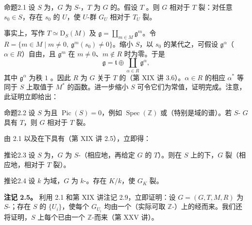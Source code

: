 \begin{SGAresult}{命题}{2.1} 设 $S$ 为，$G$ 为 $S$-，$T$ 为 $G$ 的。假设 $T$ 。则 $G$ 相对于 $T$ 裂：对任意 $s_0\in S$，存在 $s_0$ 的 $U$，使 $U$-群 $G_U$ 相对于 $T_U$ 裂。\end{SGAresult}
事实上，写作 $T\simeq\mathrm D_S(M)$ 及 $\mathfrak g=\coprod_{m\in M}\mathfrak g^m$。令 $R=\{m\in M\mid m\ne0,\ \mathfrak g^m(s_0)\ne0\}$。缩小 $S$，以 $s_0$ 的某代之，可假设 $\mathfrak g^\alpha$（$\alpha\in R$）自由，且 $\mathfrak g^m$ 在 $m\ne0$、$m\notin R$ 时为零。于是
\[\mathfrak g=\mathfrak t\oplus\coprod_{\alpha\in R}\mathfrak g^\alpha,\]
其中 $\mathfrak g^\alpha$ 为秩 $1$ 。因此 $R$ 为 $G$ 关于 $T$ 的（第 XIX 讲 3.6）。$\alpha\in R$ 的相应 $\alpha^*$ 等同于 $S$ 上取值于 $M^*$ 的函数。进一步缩小 $S$ 可令它们为常值，证明完成。注意，此证明立即给出：
\begin{SGAresult}{命题}{2.2} 设 $S$ 为且 $\operatorname{Pic}(S)=0$，例如 $\operatorname{Spec}(\mathbb Z)$ 或（特别是域的谱）。若 $S$- $G$ 具有 $T$，则 $G$ 相对于 $T$ 裂。\end{SGAresult}
由 2.1 以及在下具有（第 XIX 讲 2.5），立即得：
\begin{SGAresult}{推论}{2.3} 设 $S$ 为，$G$ 为 $S$-（相应地，再给定 $G$ 的 $T$）。则在 $S$ 上的下，$G$ 裂（相应地，相对于 $T$ 裂）。\end{SGAresult}
\begin{SGAresult}{推论}{2.4} 设 $k$ 为域，$G$ 为 $k$-。存在 $K/k$，使 $G_K$ 裂。\end{SGAresult}
\textbf{注记 2.5。} 利用 2.1 和第 XIX 讲注记 2.9，立即证明：设 $G=(G,T,M,R)$ 为 $S$-；存在 $S$ 的 $\{U_i\}$，使每个 $G_{U_i}$ 均由一个（实际可取 $\mathbb Z$-）上的经而来。我们还将证明，$S$ 上每个已由一个 $\mathbb Z$-而来（第 XXV 讲）。

